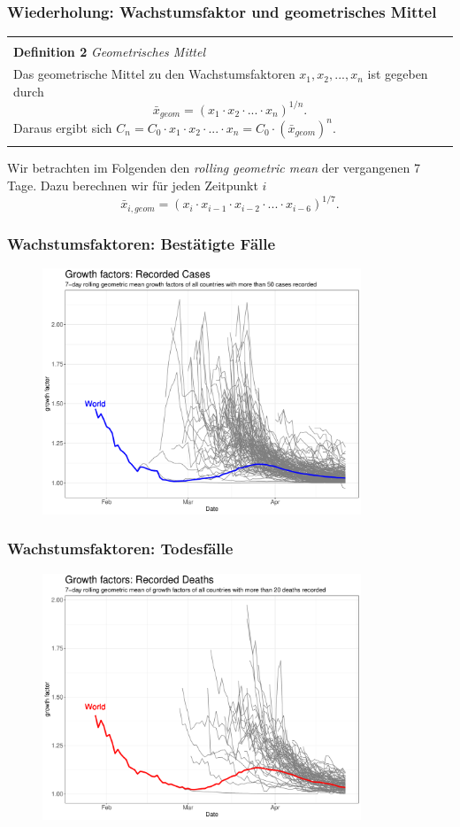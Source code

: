\documentclass{beamer}
\newenvironment{boxeded}
    {\begin{center}
    \begin{tabular}{|p{0.9\textwidth}|}
    \hline\\
    }
    { 
    \\\\\hline
    \end{tabular} 
    \end{center}
    }
\begin{document}
\begin{frame}
	\frametitle{Wiederholung: Wachstumsfaktor und geometrisches Mittel}
	\begin{boxeded}
		\textbf{Definition 2} \textit{Geometrisches Mittel}\\
		Das geometrische Mittel zu den Wachstumsfaktoren $x_1, x_2, ..., x_n$ ist gegeben durch $$\bar{x}_{geom} = (x_1 \cdot x_2 \cdot ... \cdot x_n)^{1/n}.$$ Daraus ergibt sich $C_n = C_0 \cdot x_1 \cdot x_2 \cdot ... \cdot x_n = C_0 \cdot (\bar{x}_{geom})^n$.
	\end{boxeded}
	\pause
	Wir betrachten im Folgenden den \emph{rolling geometric mean} der vergangenen 7 Tage. Dazu berechnen wir für jeden Zeitpunkt $i$ $$\bar{x}_{i, geom} = (x_i \cdot x_{i-1} \cdot x_{i-2} \cdot ... \cdot x_{i-6})^{1/7}.$$
\end{frame}

\begin{frame}
	\frametitle{Wachstumsfaktoren: Bestätigte Fälle}
	\begin{figure}
		\centering
		\includegraphics[width = 270pt]{GF_confirmed}
	\end{figure}
\end{frame}

\begin{frame}
	\frametitle{Wachstumsfaktoren: Todesfälle}
	\begin{figure}
		\centering
		\includegraphics[width = 270pt]{GF_deaths}
	\end{figure}
\end{frame}
\end{document}
